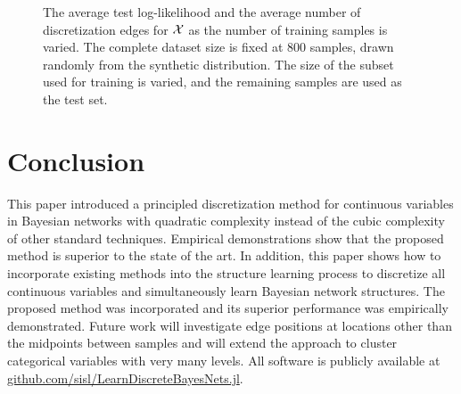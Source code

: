 \begin{figure}
	\begin{subfigure}{0.45\textwidth}
		\centering
		\scalebox{0.6}{}
	\end{subfigure}%
	\begin{subfigure}{0.45\textwidth}
		\centering
		\scalebox{0.6}{}
	\end{subfigure}

	\caption{The average test log-likelihood and the average number of discretization edges for $\mathcal{X}$ as the number of training samples is varied.
  The complete dataset size is fixed at \num{800} samples, drawn randomly from the synthetic distribution.
  The size of the subset used for training is varied, and the remaining samples are used as the test set.
  }
	\label{fig:synthetic}
\end{figure}

\section{Conclusion}
This paper introduced a principled discretization method for continuous variables in Bayesian networks with quadratic complexity instead of the cubic complexity of other standard techniques.
Empirical demonstrations show that the proposed method is superior to the state of the art.
In addition, this paper shows how to incorporate existing methods into the structure learning process to discretize all continuous variables and simultaneously learn Bayesian network structures.
The proposed method was incorporated and its superior performance was empirically demonstrated.
Future work will investigate edge positions at locations other than the midpoints between samples and will extend the approach to cluster categorical variables with very many levels.
All software is publicly available at \url{github.com/sisl/LearnDiscreteBayesNets.jl}.



